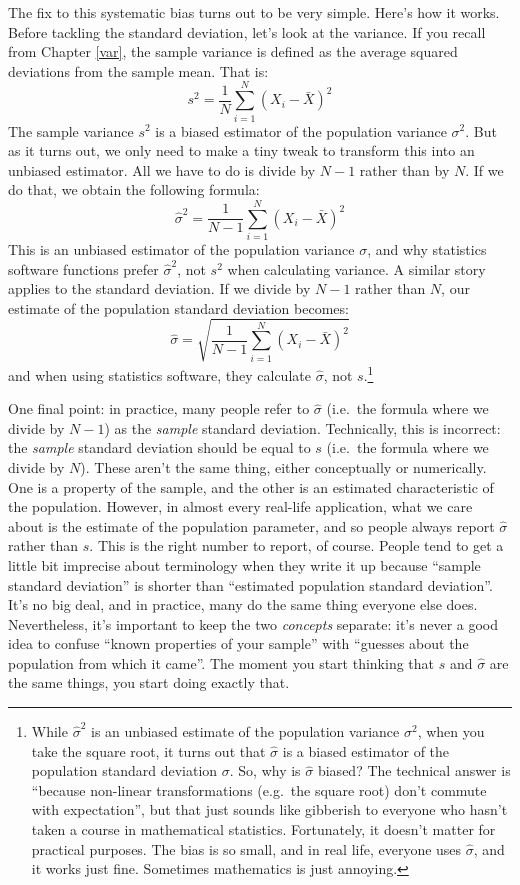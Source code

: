 \documentclass[
]{book}
\theoremstyle{definition}
\theoremstyle{definition}
\theoremstyle{definition}
\theoremstyle{definition}
\theoremstyle{remark}
\begin{document}
The fix to this systematic bias turns out to be very simple. Here's how it works. Before tackling the standard deviation, let's look at the variance. If you recall from Chapter \ref{var}, the sample variance is defined as the average squared deviations from the sample mean. That is:
\[
s^2 = \frac{1}{N} \sum_{i=1}^N (X_i - \bar{X})^2
\]
The sample variance \(s^2\) is a biased estimator of the population variance \(\sigma^2\). But as it turns out, we only need to make a tiny tweak to transform this into an unbiased estimator. All we have to do is divide by \(N-1\) rather than by \(N\). If we do that, we obtain the following formula:
\[
\hat\sigma^2 = \frac{1}{N-1} \sum_{i=1}^N (X_i - \bar{X})^2 
\]
This is an unbiased estimator of the population variance \(\sigma\), and why statistics software functions prefer \(\hat\sigma^2\), not \(s^2\) when calculating variance. A similar story applies to the standard deviation. If we divide by \(N-1\) rather than \(N\), our estimate of the population standard deviation becomes:
\[
\hat\sigma = \sqrt{\frac{1}{N-1} \sum_{i=1}^N (X_i - \bar{X})^2} 
\]
and when using statistics software, they calculate \(\hat\sigma\), not \(s\).\footnote{While \(\hat\sigma^2\) is an unbiased estimate of the population variance \(\sigma^2\), when you take the square root, it turns out that \(\hat\sigma\) is a biased estimator of the population standard deviation \(\sigma\). So, why is \(\hat\sigma\) biased? The technical answer is ``because non-linear transformations (e.g.~the square root) don't commute with expectation'', but that just sounds like gibberish to everyone who hasn't taken a course in mathematical statistics. Fortunately, it doesn't matter for practical purposes. The bias is so small, and in real life, everyone uses \(\hat\sigma\), and it works just fine. Sometimes mathematics is just annoying.}

One final point: in practice, many people refer to \(\hat{\sigma}\) (i.e.~the formula where we divide by \(N-1\)) as the \emph{sample} standard deviation. Technically, this is incorrect: the \emph{sample} standard deviation should be equal to \(s\) (i.e.~the formula where we divide by \(N\)). These aren't the same thing, either conceptually or numerically. One is a property of the sample, and the other is an estimated characteristic of the population. However, in almost every real-life application, what we care about is the estimate of the population parameter, and so people always report \(\hat\sigma\) rather than \(s\). This is the right number to report, of course. People tend to get a little bit imprecise about terminology when they write it up because ``sample standard deviation'' is shorter than ``estimated population standard deviation''. It's no big deal, and in practice, many do the same thing everyone else does. Nevertheless, it's important to keep the two \emph{concepts} separate: it's never a good idea to confuse ``known properties of your sample'' with ``guesses about the population from which it came''. The moment you start thinking that \(s\) and \(\hat\sigma\) are the same things, you start doing exactly that.
\end{document}
